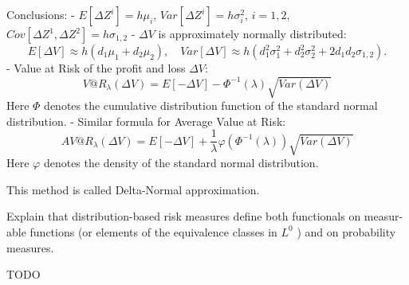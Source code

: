 Conclusions:
- \(E[\Delta Z^i] = h\mu_i\), \(Var[\Delta Z^i] = h\sigma_i^2\), \(i = 1, 2\), \(Cov[\Delta Z^1, \Delta Z^2] = h\sigma_{1,2}\)
- \(\Delta V\) is approximately normally distributed:
\[E[\Delta V] \approx h(d_1\mu_1 + d_2\mu_2), \quad Var[\Delta V] \approx h(d_1^2\sigma_1^2 + d_2^2\sigma_2^2 + 2d_1d_2\sigma_{1,2}).\]
- Value at Risk of the profit and loss \(\Delta V\):
\[V@R_{\lambda}(\Delta V) = E[-\Delta V] - \Phi^{-1}(\lambda) \sqrt{Var(\Delta V)}\]
Here \(\Phi\) denotes the cumulative distribution function of the standard normal distribution.
- Similar formula for Average Value at Risk:
\[AV@R_{\lambda}(\Delta V) = E[-\Delta V] + \frac{1}{\lambda} \varphi(\Phi^{-1}(\lambda)) \sqrt{Var(\Delta V)}\]
Here \(\varphi\) denotes the density of the standard normal distribution.

This method is called Delta-Normal approximation.

Explain that distribution-based risk measures define both functionals on measur-
able functions (or elements of the equivalence classes in \( L^0 \) ) and on probability
measures.

TODO
